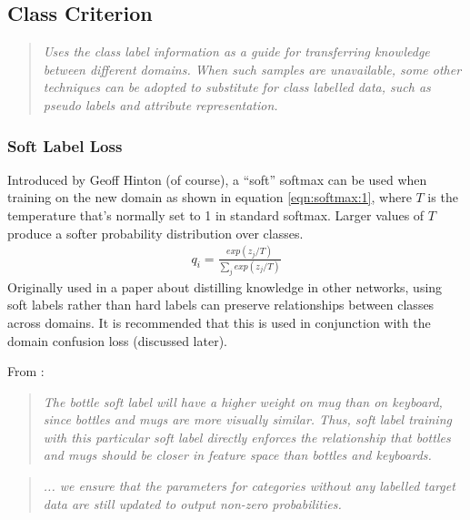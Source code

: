 \documentclass{report}
\newcommand\ddfrac[2]{\frac{\displaystyle #1}{\displaystyle #2}}
\newcommand{\quoteit}[1]{\begin{quote}\textit{#1}\end{quote}}
\begin{document}
\subsection{Class Criterion}
\quoteit{Uses the class label information as a guide for transferring knowledge between different domains. When such samples are unavailable, some other techniques can be adopted to substitute for class labelled data, such as pseudo labels and attribute representation.}

\subsubsection{Soft Label Loss}
Introduced by Geoff Hinton (of course), a ``soft'' softmax can be used when training on the new domain as shown in equation \ref{eqn:softmax:1}, where $T$ is the temperature that's normally set to 1 in standard softmax. Larger values of $T$ produce a softer probability distribution over classes.
\begin{align}
	q_{i} = \ddfrac{exp(z_{j}/T)}{\sum\nolimits_{j} exp(z_{j}/T)} \label{eqn:softmax:1}
\end{align}
Originally used in a paper about distilling knowledge in other networks, using soft labels rather than hard labels can preserve relationships between classes across domains. It is recommended that this is used in conjunction with the domain confusion loss (discussed later). \\ \par

From \parencite{simultaneousdeeptransfer}:
\quoteit{The bottle soft label will have a higher weight on mug than on keyboard, since bottles and mugs are more visually similar. Thus, soft label training with this particular soft label directly enforces the relationship that bottles and mugs should be closer in feature space than bottles and keyboards.}
\quoteit{... we ensure that the parameters for categories without any labelled target data are still updated to output non-zero probabilities.}
\end{document}
